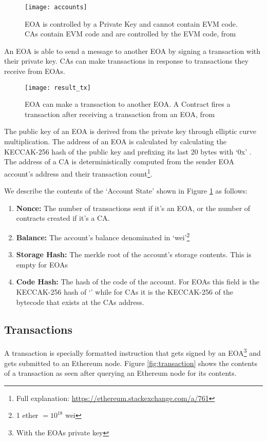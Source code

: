 \begin{figure}[H]
    \centering
    \texttt{[image: accounts]}
    \caption{EOA is controlled by a Private Key and cannot contain EVM code. CAs contain EVM code and are controlled by the EVM code, from \cite{visual}}
    \label{fig:accounts}
\end{figure}

An EOA is able to send a message to another EOA by signing a transaction with their private key. CAs can make transactions in response to transactions they receive from EOAs. 

\begin{figure}[H]
    \centering
    \texttt{[image: result\_tx]}
    \caption{EOA can make a transaction to another EOA. A Contract fires a transaction after receiving a transaction from an EOA, from \cite{preethi}}
    \label{fig:tx_accounts}
\end{figure}

The public key of an EOA is derived from the private key through elliptic curve multiplication. The address of an EOA is calculated by calculating the KECCAK-256 hash of the public key and prefixing its last 20 bytes with `0x' \cite{ethereum}. The address of a CA is deterministically computed from the sender EOA account's address and their transaction count\footnote{Full explanation: \url{https://ethereum.stackexchange.com/a/761}}.

We describe the contents of the `Account State' shown in Figure \ref{fig:accounts} as follows:
\begin{enumerate}
    \item \textbf{Nonce:} The number of transactions sent if it's an EOA, or the number of contracts created if it's a CA.
    \item \textbf{Balance:} The account's balance denominated in `wei'\footnote{1 ether $= 10^{18}$ wei }
    \item \textbf{Storage Hash:} The merkle root of the account's storage contents. This is empty for EOAs
    \item \textbf{Code Hash:} The hash of the code of the account. For EOAs this field is the KECCAK-256 hash of `' while for CAs it is the KECCAK-256 of the bytecode that exists at the CAs address.
\end{enumerate}

\subsection{Transactions} \label{transactions}
A transaction is specially formatted instruction that gets signed by an EOA\footnote{With the EOAs private key} and gets submitted to an Ethereum node. Figure \ref{fig:transaction} shows the contents of a transaction as seen after querying an Ethereum node for its contents.

